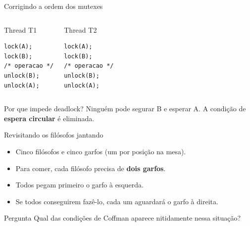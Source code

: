 \documentclass[aspectratio=169,11pt]{beamer}
\begin{document}
\begin{frame}[fragile]{Corrigindo a ordem dos mutexes}
\small
\begin{columns}[T,onlytextwidth]
\begin{block}{Thread T1}
\begin{verbatim}
lock(A);
lock(B);
/* operacao */
unlock(B);
unlock(A);
\end{verbatim}
\end{block}
\begin{block}{Thread T2}
\begin{verbatim}
lock(A);
lock(B);
/* operacao */
unlock(B);
unlock(A);
\end{verbatim}
\end{block}
\end{columns}
\vspace{.35cm}
\begin{exampleblock}{Por que impede deadlock?}
Ninguém pode segurar B e esperar A. A condição de \textbf{espera circular} é eliminada.
\end{exampleblock}
\end{frame}

\begin{frame}{Revisitando os filósofos jantando}
\small
\begin{itemize}
\setlength\itemsep{.5em}
\item Cinco filósofos e cinco garfos (um por posição na mesa).
\item Para comer, cada filósofo precisa de \textbf{dois garfos}.
\item Todos pegam primeiro o garfo à esquerda.
\item Se todos conseguirem fazê-lo, cada um aguardará o garfo à direita.
\end{itemize}
\begin{alertblock}{Pergunta}
Qual das condições de Coffman aparece nitidamente nessa situação?
\end{alertblock}
\end{frame}
\end{document}
